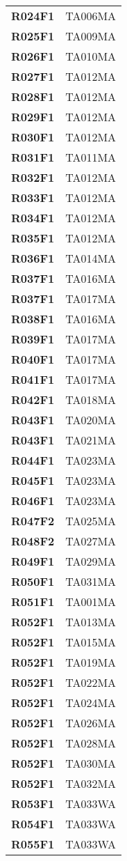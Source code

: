 \documentclass[../../piano-di-qualifica.tex]{subfiles}
\begin{document}
\begin{longtable}[H]{>{\centering\bfseries}m{5cm} >{\centering\arraybackslash}m{5cm}}
  R024F1 &  TA006MA\\
  R025F1 &  TA009MA\\
  R026F1 &  TA010MA\\
  R027F1 &  TA012MA\\
  R028F1 &  TA012MA\\
  R029F1 &  TA012MA\\
  R030F1 &  TA012MA\\
  R031F1 &  TA011MA\\
  R032F1 &  TA012MA\\
  R033F1 &  TA012MA\\
  R034F1 &  TA012MA\\
  R035F1 &  TA012MA\\
  R036F1 &  TA014MA\\
  R037F1 &  TA016MA\\
  R037F1 &  TA017MA\\
  R038F1 &  TA016MA\\
  R039F1 &  TA017MA\\
  R040F1 &  TA017MA\\
  R041F1 &  TA017MA\\
  R042F1 &  TA018MA\\
  R043F1 &  TA020MA\\
  R043F1 &  TA021MA\\
  R044F1 &  TA023MA\\
  R045F1 &  TA023MA\\
  R046F1 &  TA023MA\\
  R047F2 &  TA025MA\\
  R048F2 &  TA027MA\\
  R049F1 &  TA029MA\\
  R050F1 &  TA031MA\\
  R051F1 &  TA001MA\\
  R052F1 &  TA013MA\\
  R052F1 &  TA015MA\\
  R052F1 &  TA019MA\\
  R052F1 &  TA022MA\\
  R052F1 &  TA024MA\\
  R052F1 &  TA026MA\\
  R052F1 &  TA028MA\\
  R052F1 &  TA030MA\\
  R052F1 &  TA032MA\\
  R053F1 &  TA033WA\\
  R054F1 &  TA033WA\\
  R055F1 &  TA033WA\\

\end{longtable}
\end{document}
